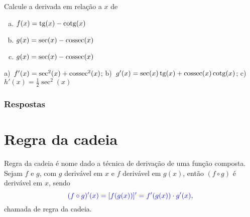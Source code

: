 \begin{exer}
  Calcule a derivada em relação a $x$ de
  \begin{enumerate}[a)]
  \item $\displaystyle f(x)=\operatorname{tg}(x)-\operatorname{cotg}(x)$
  \item $\displaystyle g(x)=\sec(x)-\operatorname{cossec}(x)$
  \item $\displaystyle g(x)=\sec(x)-\operatorname{cossec}(x)$
  \end{enumerate}
\end{exer}
\begin{resp}
  a)~$f'(x)=\sec^2(x)+\operatorname{cossec}^2(x)$; b)~$g'(x)=\sec(x)\operatorname{tg}(x)+\operatorname{cossec}(x)\operatorname{cotg}(x)$; c)~$h'(x)=\frac{1}{2}\sec^2(x)$
\end{resp}

\ifisbook
\subsubsection{Respostas}
\shipoutAnswer
\fi


\section{Regra da cadeia}\label{cap_deriv_sec_cadeia}

Regra da cadeia é nome dado a técnica de derivação de uma função composta. Sejam $f$ e $g$, com $g$ derivável em $x$ e $f$ derivável em $g(x)$, então $(f\circ g)$ é derivável em $x$, sendo
\begin{equation}
  {\color{blue} (f\circ g)'(x) = [f(g(x))]' = f'(g(x))\cdot g'(x)},
\end{equation}
chamada de regra da cadeia.


